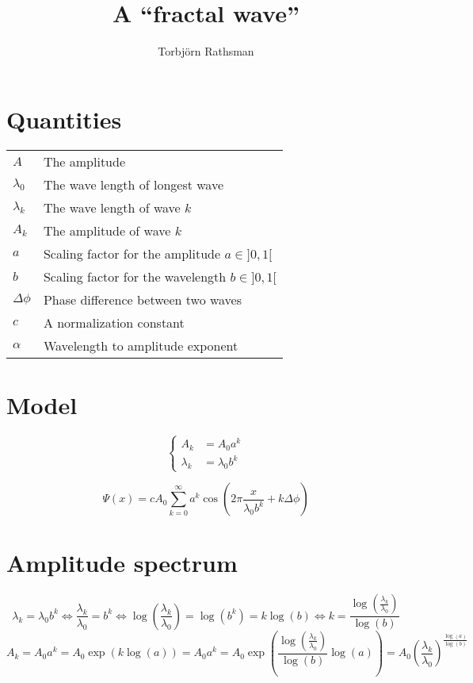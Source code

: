 \documentclass[a4paper, 12pt]{scrartcl}
\title{A ``fractal wave''}
\author{Torbjörn Rathsman}
\begin{document}
\maketitle
\section{Quantities}
\begin{tabular}{ll}
 $A$ & The amplitude \\
 $\lambda_0$ & The wave length of longest wave \\
 $\lambda_k$ & The wave length of wave $k$ \\
 $A_k$ & The amplitude of wave $k$ \\
 $a$ & Scaling factor for the amplitude $a\in]0, 1[$ \\
 $b$ & Scaling factor for the wavelength $b \in]0, 1[$\\
 $\Delta\phi$  & Phase difference between two waves\\
 $c$ & A normalization constant\\
 $\alpha$ & Wavelength to amplitude exponent\\
\end{tabular}

\section{Model}
\begin{equation}
\left\{
\begin{aligned}
	A_k &= A_0 a^k\\
	\lambda_k &= \lambda_0 b^k
\end{aligned}
\right.
\end{equation}

\begin{equation}
 \Psi(x) = c A_0\sum_{k=0}^\infty a^k\cos\left(2\pi \frac{x}{\lambda_0 b^k} + k\Delta \phi\right)
\end{equation}


\section{Amplitude spectrum}
\[
 \lambda_k = \lambda_0 b^k \Leftrightarrow
 \frac{\lambda_k}{\lambda_0} = b^k \Leftrightarrow
 \log\left(\frac{\lambda_k}{\lambda_0}\right) = \log(b^k) = k\log(b) \Leftrightarrow
 k = \frac{\log\left(\frac{\lambda_k}{\lambda_0}\right)}{\log(b)}
\]
\[
 A_k = A_0a^k = A_0\exp(k\log(a))
 =A_0a^k = A_0\exp\left(\frac{\log\left(\frac{\lambda_k}{\lambda_0}\right)}{\log(b)}\log(a)\right)
 = A_0\left(\frac{\lambda_k}{\lambda_0}\right)^{ \frac{\log(a)}{\log(b)} }
\]
\end{document}
